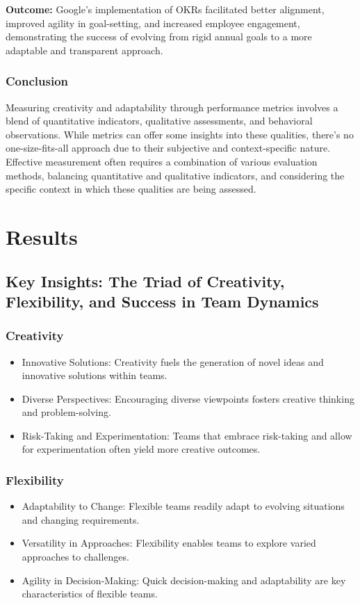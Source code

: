 \documentclass[a4paper, twoside]{article}
\begin{document}
\textbf{Outcome:} Google's implementation of OKRs facilitated better alignment, improved agility in goal-setting, and increased employee engagement, demonstrating the success of evolving from rigid annual goals to a more adaptable and transparent approach.

\subsubsection{Conclusion}

Measuring creativity and adaptability through performance metrics involves a blend of quantitative indicators, qualitative assessments, and behavioral observations. While metrics can offer some insights into these qualities, there's no one-size-fits-all approach due to their subjective and context-specific nature. Effective measurement often requires a combination of various evaluation methods, balancing quantitative and qualitative indicators, and considering the specific context in which these qualities are being assessed.


\section{Results}


\subsection{Key Insights: The Triad of Creativity, Flexibility, and Success in Team Dynamics}
\subsubsection{Creativity}
\begin{itemize}
    \item  {Innovative Solutions:} Creativity fuels the generation of novel ideas and innovative solutions within teams.
    \item  {Diverse Perspectives:} Encouraging diverse viewpoints fosters creative thinking and problem-solving.
    \item  {Risk-Taking and Experimentation:} Teams that embrace risk-taking and allow for experimentation often yield more creative outcomes.
\end{itemize}

\subsubsection{Flexibility}
\begin{itemize}
    \item  {Adaptability to Change:} Flexible teams readily adapt to evolving situations and changing requirements.
    \item  {Versatility in Approaches:} Flexibility enables teams to explore varied approaches to challenges.
    \item  {Agility in Decision-Making:} Quick decision-making and adaptability are key characteristics of flexible teams.
\end{itemize}
\end{document}
